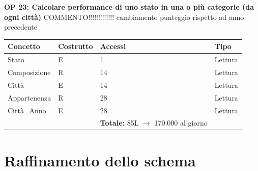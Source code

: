 \documentclass[a4paper,12pt]{report}
\begin{document}
            \textbf{OP 23: Calcolare performance di uno stato in una o più categorie (da ogni città)}
            COMMENTO!!!!!!!!!!!!! cambiamento punteggio rispetto ad anno precedente
        	\begin{table}[H]
            \centering
             \begin{tabular}{llll}
             \rowcolor{yellow!20} \textbf{Concetto} & \textbf{Costrutto} & \textbf{Accessi} & \textbf{Tipo}\\ [0.5ex] 
             \hline
             Stato & E & 1 & Lettura \\ 
             Composizione & R & 14 & Lettura \\ 
             Città & E & 14 & Lettura \\ 
             Appartenenza & R & 28 & Lettura \\ 
             Città\_Anno & E & 28 & Lettura \\ 
             \hline
                \rowcolor{yellow!20} &   & \textbf{Totale:} 85L $\rightarrow$ 170.000 al giorno &  \\ [1ex] 
             
             \end{tabular}
            \end{table}
        
        \section{Raffinamento dello schema}
\end{document}
